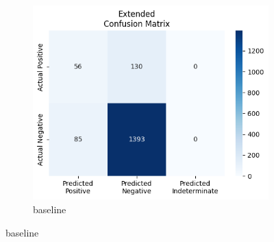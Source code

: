 \begin{figure}[H]
    \centering
    \begin{subfigure}[b]{0.5\textwidth}
        \centering
        \includegraphics[width=\linewidth]{figures/kdoqi_AVF.png}
        \caption{baseline}
        \label{fig:vascular-access}
    \end{subfigure}
    
    \vspace{1em} %


\end{figure}
